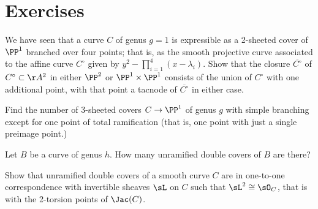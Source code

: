 \section{Exercises}
 \begin{exercise}
  We have seen that a curve $C$ of genus $g=1$ is expressible as a 2-sheeted cover of $\PP^1$ branched over four points; that is, as the smooth projective curve associated to the affine curve $C^\circ$ given by $y^2 - \prod_{i=1}^4 (x-\lambda_i)$. Show that the closure $\overline{C^\circ}$ of $C^\circ \subset \AA^2$ in either $\PP^2$ or $\PP^1 \times \PP^1$ consists of the union of $C^\circ$ with one additional point, with that point a tacnode of $\overline{C^\circ}$ in either case.
  
  \end{exercise}

\begin{exercise}
Find the number of 3-sheeted covers $C \to \PP^1$ of genus $g$ with simple branching except for one point of total ramification (that is, one point with just a single preimage point.)

\end{exercise}


\begin{exercise}
Let $B$ be a curve of genus $h$. How many unramified double covers of $B$ are there?

\end{exercise}

\begin{exercise}
Show that unramified double covers of a smooth curve $C$ are in one-to-one correspondence
with invertible sheaves $\sL$ on $C$ such that $\sL^2 \cong \sO_C$, that is with the 2-torsion points
of $\Jac(C)$.

\end{exercise}


